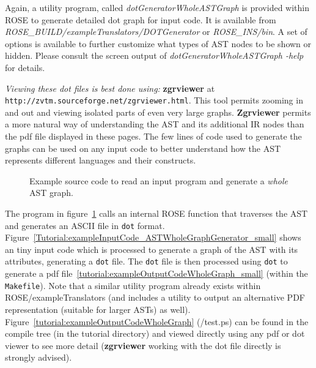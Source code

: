 Again, a utility program, called
\textit{dotGeneratorWholeASTGraph} is provided within ROSE to generate
detailed dot graph for input code. It is available from
\textit{ROSE\_BUILD/exampleTranslators/DOTGenerator} or
\textit{ROSE\_INS/bin}. A set of options is available to further customize
what types of AST nodes to be shown or hidden. Please consult the screen output of
\textit{dotGeneratorWholeASTGraph -help} for details.

   {\em Viewing these dot files is best done using:} {\bf zgrviewer} at 
{\tt http://zvtm.sourceforge.net/zgrviewer.html}.  This tool permits zooming
in and out and viewing isolated parts of even very large graphs. {\bf Zgrviewer} permits 
a more natural way of understanding the AST and its additional IR nodes than the 
pdf file displayed in these pages.  The few lines of code used to generate the
graphs can be used on any input code to better understand how the AST represents
different languages and their constructs.

\begin{figure}[!h]
{\indent
{\mySmallFontSize

\begin{latexonly}
   
\end{latexonly}

\begin{htmlonly}
   
\end{htmlonly}

}
}
\caption{Example source code to read an input program and generate a {\em whole} AST graph.}
\label{Tutorial:exampleASTWholeGraphGenerator}
\end{figure}

The program in figure~\ref{Tutorial:exampleASTWholeGraphGenerator} calls 
an internal ROSE function that traverses the AST and generates 
an ASCII file in {\tt dot} format.
Figure~\ref{Tutorial:exampleInputCode_ASTWholeGraphGenerator_small} shows an tiny input
code which is processed to generate a graph of the AST with its attributes, generating a 
{\tt dot} file.   The {\tt dot} file is then processed
using {\tt dot} to generate a pdf file~\ref{tutorial:exampleOutputCodeWholeGraph_small}
(within the {\tt Makefile}).
Note that a similar utility program already exists within ROSE/exampleTranslators
(and includes a utility to output an alternative PDF representation 
(suitable for larger ASTs) as well).  Figure~\ref{tutorial:exampleOutputCodeWholeGraph}
(\TutorialExampleBuildDirectory/test.ps) can be found in the compile 
tree (in the tutorial directory) and viewed directly using 
any pdf or dot viewer to see more detail ({\bf zgrviewer} working with
the dot file directly is strongly advised).

